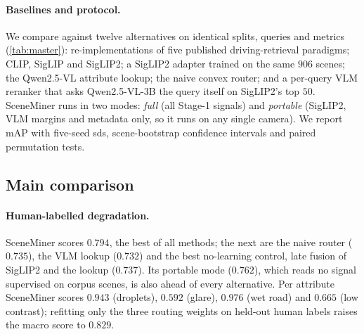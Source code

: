 \documentclass[10pt,twocolumn,letterpaper]{article}
\newcommand{\cont}{$^{\dagger}$}
\begin{document}
\begin{table}[t]\centering\small
\caption{\textbf{Comparison with published driving-retrieval paradigms and
foundation models} (mAP; identical splits, queries and metrics). \emph{Degradation}:
four degradation queries on $550$ human-labelled scenes. \emph{BDD100K}: $12$
queries on $1000$ external images, and the pre-registered $36$-query holdout on
$2000$ untouched images. \emph{Semantic}: $40$ object queries graded by nuScenes
human 3D annotation. Mean: unweighted mean of the four columns. ms: online cost per
query on $1508$ cached scenes (A40). ``-style'' rows re-implement the paradigm on our
cached signals (supplementary). --: the method needs BEV or tags, which monocular
images lack. \cont~reads BEV or tags supervised on corpus scenes. Subscripts: sd over
five seeds. SceneMiner has the best degradation score and the best mean; the per-query
VLM reranker leads externally at $2300\times$ the cost. All columns, SigLIP
ViT-B/16 and a second CARIM variant: supplementary.}
\label{tab:master}

\end{table}

\paragraph{Baselines and protocol.} We compare against twelve alternatives on
identical splits, queries and metrics (\cref{tab:master}): re-implementations of
five published driving-retrieval paradigms; CLIP, SigLIP and SigLIP2; a SigLIP2 adapter
trained on the same $906$ scenes; the Qwen2.5-VL attribute lookup; the naive convex
router; and a per-query VLM reranker that asks Qwen2.5-VL-3B the query itself on
SigLIP2's top $50$. SceneMiner runs in two modes: \emph{full} (all Stage-1 signals)
and \emph{portable} (SigLIP2, VLM margins and metadata only, so it runs on any single
camera). We report mAP with five-seed sds, scene-bootstrap confidence intervals and
paired permutation tests.

\subsection{Main comparison}
\paragraph{Human-labelled degradation.} SceneMiner scores $0.794$, the best of all
methods; the next are the naive router ($0.735$), the VLM lookup ($0.732$) and the
best no-learning control, late fusion of SigLIP2 and the lookup ($0.737$). Its
portable mode ($0.762$), which reads no signal supervised on corpus scenes, is also
ahead of every alternative. Per attribute SceneMiner scores $0.943$ (droplets),
$0.592$ (glare), $0.976$ (wet road) and $0.665$ (low contrast); refitting only the
three routing weights on held-out human labels raises the macro score to $0.829$.
\end{document}

